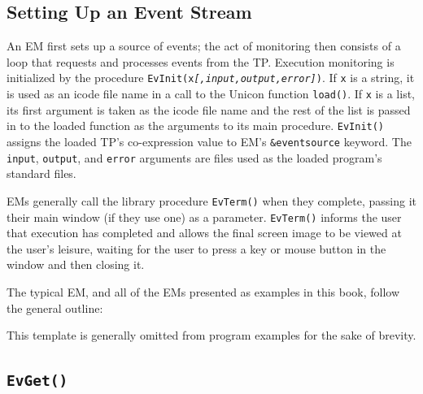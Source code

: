 \subsection*{Setting Up an Event Stream}

\vspace{0.25pc}
\noindent
An EM first sets up a source of events; the act of monitoring then
consists of a loop that requests and processes events from the TP.
Execution monitoring is initialized by the procedure
{\tt EvInit(x{\em [,input,output,error]\/})}.  If {\tt x} is a string, it is
used as an icode file name in a call to the Unicon function {\tt load()}.
If {\tt x} is a list, its first argument is taken as the icode file name
and the rest of the list is passed in to the loaded function as the
arguments to its main procedure.
{\tt EvInit()} assigns the loaded
TP's co-expression value to EM's {\tt \&eventsource} keyword.
The {\tt input}, {\tt output}, and {\tt error} arguments are files
used as the loaded program's standard files.

EMs generally call the library procedure {\tt EvTerm()} when they complete,
passing it their main window (if they use one) as a parameter.
{\tt EvTerm()} informs the user that execution has completed and allows the
final screen image to be viewed at the user's leisure, waiting for the user to
press a key or mouse button in the window and then closing it.

The typical EM, and all of the EMs presented as examples in this
book, follow the general outline:
 

{}
\noindent This template is generally omitted from program examples for
the sake of brevity.

\subsection*{\tt EvGet()}

